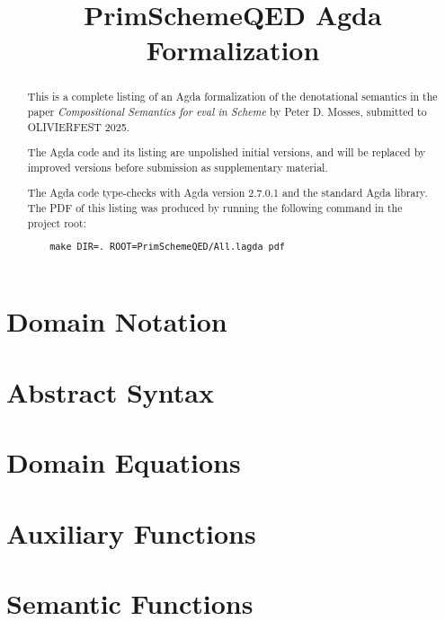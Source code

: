 \documentclass[a4paper]{article}
\title{PrimSchemeQED Agda Formalization}
\begin{document}
\maketitle

\begin{abstract}
  This is a complete listing of an Agda formalization of the denotational semantics
  in the paper \emph{Compositional Semantics for eval in Scheme} by Peter D. Mosses,
  submitted to OLIVIERFEST 2025.

  The Agda code and its listing are unpolished initial versions,
  and will be replaced by improved versions before submission as supplementary material.

  The Agda code type-checks with Agda version 2.7.0.1 and the standard Agda library.
  The PDF of this listing was produced by running the following command in the project root:

  \begin{verbatim}
    make DIR=. ROOT=PrimSchemeQED/All.lagda pdf
  \end{verbatim}
\end{abstract}


\clearpage

\section{Domain Notation}

\clearpage

\section{Abstract Syntax}

\clearpage

\section{Domain Equations}

\clearpage

\section{Auxiliary Functions}

\clearpage

\section{Semantic Functions}

\end{document}
